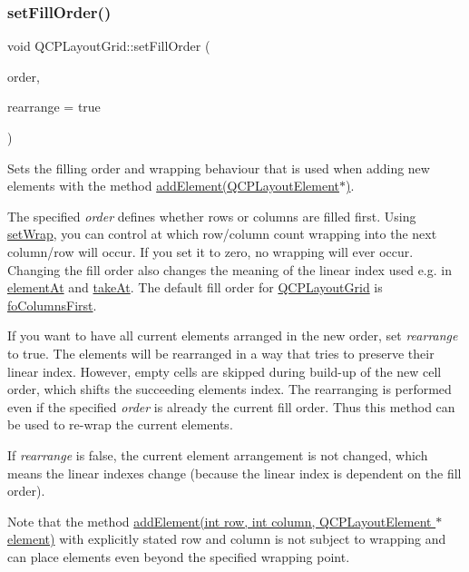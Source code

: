 \subsubsection{\texorpdfstring{set\+Fill\+Order()}{setFillOrder()}}
{\footnotesize\ttfamily void Q\+C\+P\+Layout\+Grid\+::set\+Fill\+Order (\begin{DoxyParamCaption}\item[{\hyperlink{classQCPLayoutGrid_a7d49ee08773de6b2fd246edfed353cca}{Fill\+Order}}]{order,  }\item[{bool}]{rearrange = {\ttfamily true} }\end{DoxyParamCaption})}

Sets the filling order and wrapping behaviour that is used when adding new elements with the method \hyperlink{classQCPLayoutGrid_a4c44025dd25acd27e053cadfd448ad7b}{add\+Element(\+Q\+C\+P\+Layout\+Element$\ast$)}.

The specified {\itshape order} defines whether rows or columns are filled first. Using \hyperlink{classQCPLayoutGrid_ab36af18d77e4428386d02970382ee598}{set\+Wrap}, you can control at which row/column count wrapping into the next column/row will occur. If you set it to zero, no wrapping will ever occur. Changing the fill order also changes the meaning of the linear index used e.\+g. in \hyperlink{classQCPLayoutGrid_a4288f174082555f6bd92021bdedb75dc}{element\+At} and \hyperlink{classQCPLayoutGrid_a17dd220234d1bbf8835abcc666384d45}{take\+At}. The default fill order for \hyperlink{classQCPLayoutGrid}{Q\+C\+P\+Layout\+Grid} is \hyperlink{classQCPLayoutGrid_a7d49ee08773de6b2fd246edfed353ccaac4cb4b796ec4822d5894b47b51627fb3}{fo\+Columns\+First}.

If you want to have all current elements arranged in the new order, set {\itshape rearrange} to true. The elements will be rearranged in a way that tries to preserve their linear index. However, empty cells are skipped during build-\/up of the new cell order, which shifts the succeeding element\textquotesingle{}s index. The rearranging is performed even if the specified {\itshape order} is already the current fill order. Thus this method can be used to re-\/wrap the current elements.

If {\itshape rearrange} is false, the current element arrangement is not changed, which means the linear indexes change (because the linear index is dependent on the fill order).

Note that the method \hyperlink{classQCPLayoutGrid_adff1a2ca691ed83d2d24a4cd1fe17012}{add\+Element(int row, int column, Q\+C\+P\+Layout\+Element $\ast$element)} with explicitly stated row and column is not subject to wrapping and can place elements even beyond the specified wrapping point.

